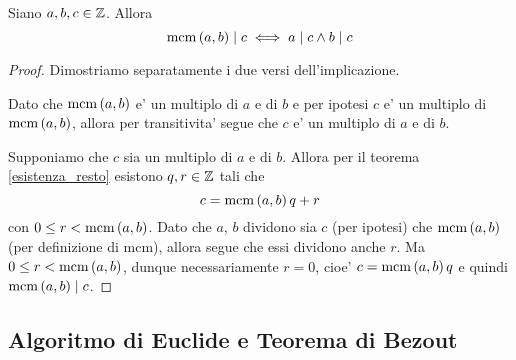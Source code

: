 \begin{proposition}\label{mcm|c_iff_a,b|c}
    Siano $a, b, c \in \mathbb{Z}$. Allora \begin{equation}
        \operatorname{mcm}\left(a, b\right) \mid c \iff a \mid c \land b \mid c
    \end{equation}
\end{proposition}
\begin{proof}
    Dimostriamo separatamente i due versi dell'implicazione.

    Dato che $\operatorname{mcm}\left(a, b\right)$ e' un multiplo di $a$ e di $b$ e per ipotesi $c$ e' un multiplo di $\operatorname{mcm}\left(a, b\right)$, allora per transitivita' segue che $c$ e' un multiplo di $a$ e di $b$.

    Supponiamo che $c$ sia un multiplo di $a$ e di $b$. Allora per il teorema \ref{esistenza_resto} esistono $q, r \in \mathbb{Z}$ tali che \[
        c = \operatorname{mcm}\left(a, b\right)q + r
    \]
    con $0 \leq r < \operatorname{mcm}\left(a, b\right)$.
    Dato che $a$, $b$ dividono sia $c$ (per ipotesi) che $\operatorname{mcm}\left(a, b\right)$ (per definizione di mcm), allora segue che essi dividono anche $r$. Ma $0 \leq r < \operatorname{mcm}\left(a, b\right)$, dunque necessariamente $r = 0$, cioe' $c = \operatorname{mcm}\left(a, b\right)q$ e quindi $\operatorname{mcm}\left(a, b\right) \mid c$.
\end{proof}


\subsection{Algoritmo di Euclide e Teorema di Bezout}

